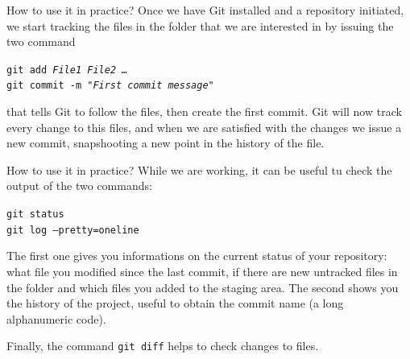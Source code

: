 \documentclass[aspectratio=169]{beamer}
\newcommand{\git}{Git{}}
\newcommand{\cd}[1]{\texttt{#1}}
\begin{document}
\begin{frame}{How to use it in practice?}
    Once we have \git{} installed and a repository initiated, we start tracking the files in the folder that we are interested in by issuing the two command 
    \begin{flushleft}
        \cd{git add \textit{File1} \textit{File2} \textit{\dots}}\\
        \cd{git commit -m \textit{"First commit message"}}
    \end{flushleft}
    that tells \git{} to follow the files, then create the first commit. \git{} will now track every change to this files, and when we are satisfied with the changes we issue a new commit, \alert{snapshooting} a new point in the history of the file.
    
\end{frame}

\begin{frame}{How to use it in practice?}
    While we are working, it can be useful tu check the output of the two commands:
    \begin{flushleft}
        \cd{git status}\\
        \cd{git log --pretty=oneline}
    \end{flushleft}
    The first one gives you informations on the \alert{current status} of your repository: what file you modified since the last commit, if there are new untracked files in the folder and which files you added to the staging area. The second shows you the \alert{history of the project}, useful to obtain the commit name (a long alphanumeric code).
    
    Finally, the command \cd{git diff} helps to check \alert{changes} to files.
\end{frame}
\end{document}
